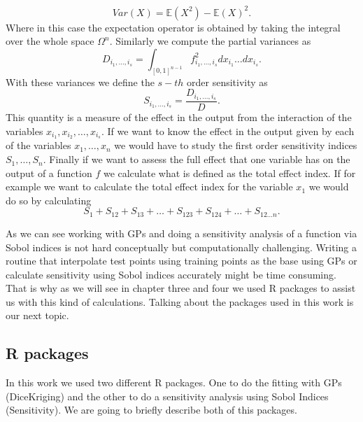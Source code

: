 \documentclass[12pt]{book}
\newcommand{\E}{\mathbb{E}} %
\begin{document}
\begin{equation*}
Var(X)=\E(X^{2})-\E(X)^{2}.
\end{equation*}
Where in this case the expectation operator is obtained by taking the integral over the whole space $\Omega^{n}$.
Similarly we compute the partial variances as
\begin{equation*}
D_{i_{1},\ldots,i_{s}}=\int_{[0,1]^{n-1}}f^{2}_{i_{1},\ldots,i_{s}}dx_{i_{1}}\ldots dx_{i_{s}}.
\end{equation*}
With these variances we define the $s-th$ order sensitivity  as
\begin{equation*} 
S_{i_{1},\ldots,i_{s}}=\frac{D_{i_{1},\ldots,i_{s}}}{D}.
\end{equation*}
This quantity is a measure of the effect in the output from the interaction of the 
variables $x_{i_{1}},x_{i_{2}},\ldots,x_{i_{s}}$. If 
we want to know the effect in the output given by   each of the variables 
$x_{1},\ldots,x_{n}$ we would have to study
the first order sensitivity indices $S_{1},\ldots,S_{n}$.
Finally if we want to assess the full effect that one variable has on the output of a function $f$ we calculate
what is defined as the total effect index. If for example we want to calculate the total effect index
for the variable $x_{1}$ we would do so by calculating
\begin{equation*}
S_{1}+S_{12}+S_{13}+\ldots+S_{123}+S_{124}+\ldots+S_{12\ldots n}.
\end{equation*}


As we can see working with GPs and doing  a  sensitivity analysis  of a 
function via Sobol indices is not hard conceptually but computationally challenging. Writing a routine that
interpolate test points using training points as the base  using GPs or calculate sensitivity using 
Sobol indices accurately might be time consuming.
That is why as  we will see
in chapter three and  four we used R packages to assist us with this kind of calculations. 
Talking about the packages used in this work is our next topic.



\subsection{R packages}
In this work we used two different R packages. One to do the fitting with GPs (DiceKriging) and the other to do 
a sensitivity analysis using Sobol Indices (Sensitivity). We are going to briefly describe both of this packages.
\end{document}
